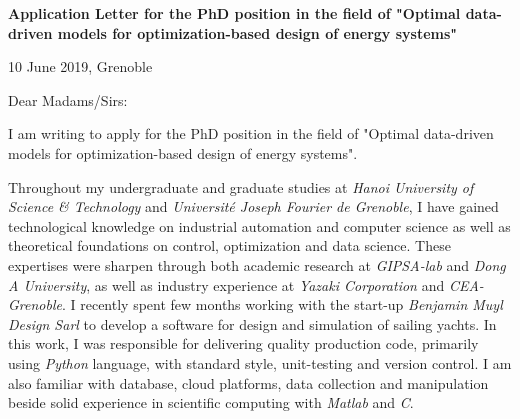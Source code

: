 \documentclass[a4paper,11pt]{article}
\begin{document}
{\hspace*{-\marginparsep minus \marginparwidth}
\begin{minipage}[t]{\textwidth+\marginparwidth+\marginparsep}

\textbf{Application Letter for the PhD position in the field of "Optimal data-driven models for optimization-based design of energy systems"}

\vspace{0.75cm}

\hfill{10 June 2019, Grenoble}

\vspace{0.75cm}

Dear Madams/Sirs: 

\vspace{0.3cm}

I am writing to apply for the PhD position in the field of "Optimal data-driven models for optimization-based design of energy systems". 

\vspace{0.3cm}

Throughout my undergraduate and graduate studies at \emph{Hanoi University of Science \& Technology} and \emph{Universit\'{e} Joseph Fourier de Grenoble}, I have gained technological knowledge on industrial automation and computer science as well as theoretical foundations on control, optimization and data science. These expertises were sharpen through both academic research at \emph{GIPSA-lab} and \emph{Dong A University}, as well as industry experience at \emph{Yazaki Corporation} and \emph{CEA-Grenoble}. I recently spent few months working with the start-up \emph{Benjamin Muyl Design Sarl} to develop a software for design and simulation of sailing yachts. In this work, I was responsible for delivering quality production code, primarily using \emph{Python} language, with standard style, unit-testing and version control. I am also familiar with database, cloud platforms, data collection and manipulation beside solid experience in scientific computing with \emph{Matlab} and \emph{C}. 

\vspace{0.3cm}


\end{minipage}}
\end{document}
